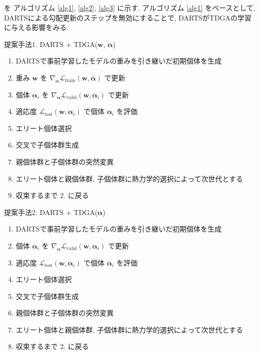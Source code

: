\noindent
を アルゴリズム \ref{alg1}, \ref{alg2}, \ref{alg3} に示す.
アルゴリズム \ref{alg1} をベースとして, DARTSによる勾配更新のステップを無効にすることで,
DARTSがTDGAの学習に与える影響をみる.

\begin{algorithm}[tb]
  \caption{提案手法1. DARTS + TDGA($\bm{w}$, $\bm{\alpha}$)}
  \label{alg1}
  \begin{enumerate}
    \item DARTSで事前学習したモデルの重みを引き継いだ初期個体を生成
    \item 重み $\bm{w}$ を $\displaystyle \nabla_{\bm{\alpha}} \mathcal{L}_{\mathrm{train}}(\bm{w}, \bar{\bm{\alpha}})$ で更新
    \item 個体 $\bm{\alpha}_i$ を $\displaystyle \nabla_{\bm{\alpha}} \mathcal{L}_{\mathrm{valid}}(\bm{w}, \bm{\alpha}_i)$ で更新
    \item 適応度 $\displaystyle \mathcal{L}_{\mathrm{test}}(\bm{w}, \bm{\alpha}_i)$ で個体 $\bm{\alpha}_i$ を評価
    \item エリート個体選択
    \item 交叉で子個体群生成
    \item 親個体群と子個体群の突然変異
    \item エリート個体と親個体群, 子個体群に熱力学的選択によって次世代とする
    \item 収束するまで 2. に戻る
  \end{enumerate}
\end{algorithm}


\begin{algorithm}[tb]
  \caption{提案手法2. DARTS + TDGA($\bm{\alpha}$)}
  \label{alg2}
  \begin{enumerate}
    \item DARTSで事前学習したモデルの重みを引き継いだ初期個体を生成
    \item 個体 $\bm{\alpha}_i$ を $\displaystyle \nabla_{\bm{\alpha}} \mathcal{L}_{\mathrm{valid}}(\bm{w}, \bm{\alpha}_i)$ で更新
    \item 適応度 $\displaystyle \mathcal{L}_{\mathrm{test}}(\bm{w}, \bm{\alpha}_i)$ で個体 $\bm{\alpha}_i$ を評価
    \item エリート個体選択
    \item 交叉で子個体群生成
    \item 親個体群と子個体群の突然変異
    \item エリート個体と親個体群, 子個体群に熱力学的選択によって次世代とする
    \item 収束するまで 2. に戻る
  \end{enumerate}
\end{algorithm}

